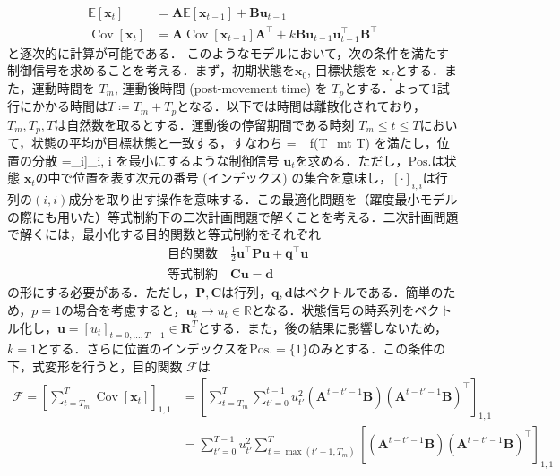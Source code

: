 \begin{align}
\mathbb{E}\left[\mathbf{x}_{t}\right] &=\mathbf{A}\mathbb{E}\left[\mathbf{x}_{t-1}\right] + \mathbf{B} \mathbf{u}_{t-1}\\
\operatorname{Cov}\left[\mathbf{x}_{t}\right]&=\mathbf{A}\operatorname{Cov}\left[\mathbf{x}_{t-1}\right]\mathbf{A}^\top + k\mathbf{B} \mathbf{u}_{t-1} \mathbf{u}_{t-1}^\top \mathbf{B}^\top
\end{align}
と逐次的に計算が可能である．
このようなモデルにおいて，次の条件を満たす制御信号を求めることを考える．まず，初期状態を$\mathbf{x}_0$, 目標状態を $\mathbf{x}_f$とする．また，運動時間を $T_m$, 運動後時間 (post-movement time) を $T_p$とする．よって1試行にかかる時間は$T\coloneqq T_m + T_p$となる．以下では時間は離散化されており，$T_m, T_p, T$は自然数を取るとする．運動後の停留期間である時刻 $T_m\leq t \leq T$において，状態の平均が目標状態と一致する，すなわち
 = _f\quad (T_m\leq t \leq T)
を満たし，位置の分散
=\sum_{i\in {}}\left[\sum_{t=T_m}^{T} \operatorname{Cov}\left[\mathbf{x}_{t}\right]\right]_{i, i}
を最小にするような制御信号 $\mathbf{u}_t$を求める．ただし，$\mathrm{Pos.}$は状態 $\mathbf{x}_t$の中で位置を表す次元の番号 (インデックス) の集合を意味し，$[\cdot]_{i,i}$は行列の$(i,i)$成分を取り出す操作を意味する．この最適化問題を（躍度最小モデルの際にも用いた）等式制約下の二次計画問題で解くことを考える．二次計画問題で解くには，最小化する目的関数と等式制約をそれぞれ
\begin{align}
&{\text{目的関数}}\quad {\frac {1}{2}}\mathbf{u}^\top \mathbf{P}\mathbf{u} +\mathbf{q} ^{\top}\mathbf{u}\\
&{\text{等式制約}}\quad \mathbf{C}\mathbf{u} =\mathbf{d}
\end{align}
の形にする必要がある．ただし，$\mathbf{P}, \mathbf{C}$は行列，$\mathbf{q}, \mathbf{d}$はベクトルである．簡単のため，$p=1$の場合を考慮すると，$\mathbf{u}_t \to u_{t} \in \mathbb{R}$となる．状態信号の時系列をベクトル化し，$\mathbf{u}=[u_t]_{t=0, \ldots, T-1} \in \mathbf{R}^{T}$とする．また，後の結果に影響しないため，$k=1$とする．さらに位置のインデックスを$\mathrm{Pos.}=\{1\}$のみとする．この条件の下，式変形を行うと，目的関数 $\mathcal{F}$は
\begin{align}
\mathcal{F}=\left[\sum_{t=T_m}^{T} \operatorname{Cov}\left[\mathbf{x}_{t}\right]\right]_{1,1}
&=\left[\sum_{t=T_m}^{T}\sum_{t'=0}^{t-1}u_{t'}^2\left(\mathbf{A}^{t-t'-1} \mathbf{B}\right) \left(\mathbf{A}^{t-t'-1} \mathbf{B}\right)^{\top}\right]_{1,1}\\
&=\sum_{t'=0}^{T-1} u_{t'}^2 \sum_{t=\max(t'+1, T_m)}^{T} \left[\left(\mathbf{A}^{t-t'-1} \mathbf{B}\right)\left(\mathbf{A}^{t-t'-1} \mathbf{B}\right)^{\top} \right]_{1,1}
\end{align}
